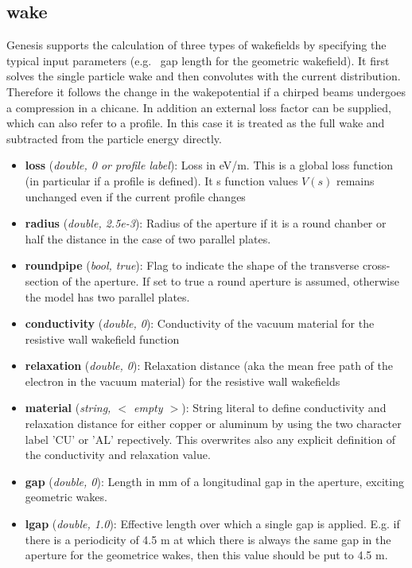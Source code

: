 \documentclass[12pt]{book}
\begin{document}
\subsection {\sf wake}
Genesis supports the calculation of three types of wakefields by specifying the typical input parameters (e.g.~ gap length for the geometric wakefield). It first solves the single particle wake and then convolutes with the current distribution. Therefore it follows the change in the wakepotential if a chirped beams undergoes a compression in a chicane. In addition an external loss factor can be supplied, which can also refer to a profile. In this case it is treated as the full wake and subtracted from the particle energy directly.
\begin{itemize}
\item {\bf loss} ({\it double, 0 or profile label}): Loss in eV/m. This is a global loss function (in particular if a profile is defined). It s function values $V(s)$ remains unchanged even if the current profile changes
\item {\bf radius} ({\it  double, 2.5e-3}): Radius of the aperture if it is a round chanber or half the distance in the case of two parallel plates.
\item {\bf roundpipe} ({\it bool, true}): Flag to indicate the shape of the transverse cross-section of the aperture. If set to true a round aperture is assumed, otherwise the model has two parallel plates.
\item {\bf conductivity} ({\it double, 0}): Conductivity of the vacuum material for the resistive wall wakefield function
\item {\bf relaxation} ({\it double, 0}): Relaxation distance (aka the mean free path of the electron in the vacuum material) for the resistive wall wakefields
\item {\bf material} ({\it string, $<$ empty $>$}): String literal to define conductivity and relaxation distance for either copper or aluminum by using the two character label 'CU' or 'AL' repectively. This overwrites also any explicit definition of the conductivity and relaxation value.
\item {\bf gap} ({\it double, 0}): Length in mm of a longitudinal gap in the aperture, exciting geometric wakes.
\item {\bf lgap} ({\it double, 1.0}): Effective length over which a single gap is applied. E.g. if there is a periodicity of 4.5 m at which there is always the same gap in the aperture for the geometrice wakes, then this value should be put to 4.5 m.

\end{itemize}
\end{document}
